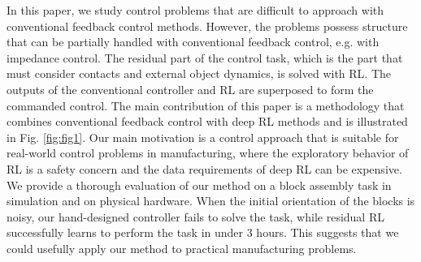 In this paper, we study control problems that are difficult to approach with conventional feedback control methods. 
However, the problems possess structure that can be partially handled with conventional feedback control, e.g. with impedance control.
The residual part of the control task, which is the part that must consider contacts and external object dynamics, is solved with RL. The outputs of the conventional controller and RL are superposed to form the commanded control.
The main contribution of this paper is a methodology that combines conventional feedback control with deep RL methods and is illustrated in Fig. \ref{fig:fig1}.
Our main motivation is a control approach that is suitable for real-world control problems in manufacturing, where the exploratory behavior of RL is a safety concern and the data requirements of deep RL can be expensive.
We provide a thorough evaluation of our method on a block assembly task in simulation and on physical hardware. When the initial orientation of the blocks is noisy, our hand-designed controller fails to solve the task, while residual RL successfully learns to perform the task in under 3 hours. This suggests that we could usefully apply our method to practical manufacturing problems.